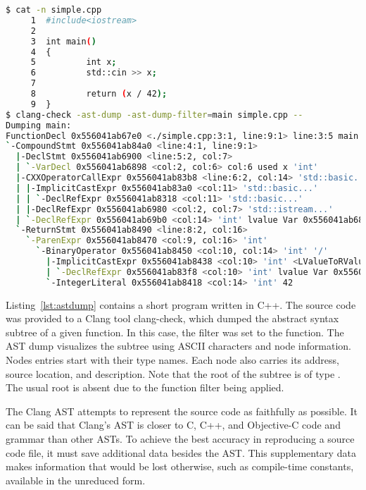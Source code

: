 \begin{lstlisting}[caption=Clang AST Dump., language=bash, 
label={lst:astdump}, basicstyle=\tiny, numbers=none]
$ cat -n simple.cpp
     1  #include<iostream>
     2
     3  int main()
     4  {
     5          int x;
     6          std::cin >> x;
     7
     8          return (x / 42);
     9  } 
$ clang-check -ast-dump -ast-dump-filter=main simple.cpp --
Dumping main:
FunctionDecl 0x556041ab67e0 <./simple.cpp:3:1, line:9:1> line:3:5 main 'int ()'
`-CompoundStmt 0x556041ab84a0 <line:4:1, line:9:1>
  |-DeclStmt 0x556041ab6900 <line:5:2, col:7>
  | `-VarDecl 0x556041ab6898 <col:2, col:6> col:6 used x 'int'
  |-CXXOperatorCallExpr 0x556041ab83b8 <line:6:2, col:14> 'std::basic...'
  | |-ImplicitCastExpr 0x556041ab83a0 <col:11> 'std::basic...'
  | | `-DeclRefExpr 0x556041ab8318 <col:11> 'std::basic...'
  | |-DeclRefExpr 0x556041ab6980 <col:2, col:7> 'std::istream...'
  | `-DeclRefExpr 0x556041ab69b0 <col:14> 'int' lvalue Var 0x556041ab6898 'x' 'int'
  `-ReturnStmt 0x556041ab8490 <line:8:2, col:16>
    `-ParenExpr 0x556041ab8470 <col:9, col:16> 'int'
      `-BinaryOperator 0x556041ab8450 <col:10, col:14> 'int' '/'
        |-ImplicitCastExpr 0x556041ab8438 <col:10> 'int' <LValueToRValue>
        | `-DeclRefExpr 0x556041ab83f8 <col:10> 'int' lvalue Var 0x556041ab6898 'x' 'int'
        `-IntegerLiteral 0x556041ab8418 <col:14> 'int' 42
\end{lstlisting}

Listing~\ref{lst:astdump} contains a short program written in C++.
The source code was provided to a Clang tool clang-check, which
dumped the abstract syntax subtree of a given function.
In this case, the filter was set to the  function.
The AST dump visualizes the subtree using ASCII characters
and node information.
Nodes entries start with their type names. 
Each node also carries its address, source location, and description.
Note that the root of the subtree is of type .
The usual root  is absent due to the function
filter being applied.

The Clang AST attempts to represent the source code as faithfully 
as possible. 
It can be said that Clang's AST is closer to C, C++, 
and Objective-C code and grammar than other ASTs. 
To achieve the best accuracy in reproducing a source code file, 
it must save additional data besides the AST. 
This supplementary data makes information that would be lost 
otherwise, such as compile-time constants, available 
in the unreduced form. 

